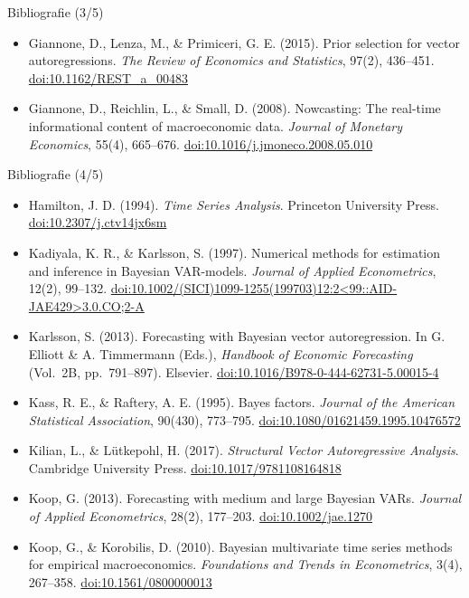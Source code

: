 \begin{frame}{Bibliografie (3/5)}
\begin{itemize}
    \item Giannone, D., Lenza, M., \& Primiceri, G. E. (2015). Prior selection for vector autoregressions. \textit{The Review of Economics and Statistics}, 97(2), 436--451. \href{https://doi.org/10.1162/REST_a_00483}{doi:10.1162/REST\_a\_00483}
    \item Giannone, D., Reichlin, L., \& Small, D. (2008). Nowcasting: The real-time informational content of macroeconomic data. \textit{Journal of Monetary Economics}, 55(4), 665--676. \href{https://doi.org/10.1016/j.jmoneco.2008.05.010}{doi:10.1016/j.jmoneco.2008.05.010}
\end{itemize}
\end{frame}

\begin{frame}{Bibliografie (4/5)}
\itemsize{\tiny}
\begin{itemize}
    \item Hamilton, J. D. (1994). \textit{Time Series Analysis}. Princeton University Press. \href{https://doi.org/10.2307/j.ctv14jx6sm}{doi:10.2307/j.ctv14jx6sm}
    \item Kadiyala, K. R., \& Karlsson, S. (1997). Numerical methods for estimation and inference in Bayesian VAR-models. \textit{Journal of Applied Econometrics}, 12(2), 99--132. \href{https://doi.org/10.1002/(SICI)1099-1255(199703)12:2\%3C99::AID-JAE429\%3E3.0.CO;2-A}{doi:10.1002/(SICI)1099-1255(199703)12:2\textless{}99::AID-JAE429\textgreater{}3.0.CO;2-A}
    \item Karlsson, S. (2013). Forecasting with Bayesian vector autoregression. In G. Elliott \& A. Timmermann (Eds.), \textit{Handbook of Economic Forecasting} (Vol.\ 2B, pp.\ 791--897). Elsevier. \href{https://doi.org/10.1016/B978-0-444-62731-5.00015-4}{doi:10.1016/B978-0-444-62731-5.00015-4}
    \item Kass, R. E., \& Raftery, A. E. (1995). Bayes factors. \textit{Journal of the American Statistical Association}, 90(430), 773--795. \href{https://doi.org/10.1080/01621459.1995.10476572}{doi:10.1080/01621459.1995.10476572}
    \item Kilian, L., \& Lütkepohl, H. (2017). \textit{Structural Vector Autoregressive Analysis}. Cambridge University Press. \href{https://doi.org/10.1017/9781108164818}{doi:10.1017/9781108164818}
    \item Koop, G. (2013). Forecasting with medium and large Bayesian VARs. \textit{Journal of Applied Econometrics}, 28(2), 177--203. \href{https://doi.org/10.1002/jae.1270}{doi:10.1002/jae.1270}
    \item Koop, G., \& Korobilis, D. (2010). Bayesian multivariate time series methods for empirical macroeconomics. \textit{Foundations and Trends in Econometrics}, 3(4), 267--358. \href{https://doi.org/10.1561/0800000013}{doi:10.1561/0800000013}

\end{itemize}
\end{frame}
